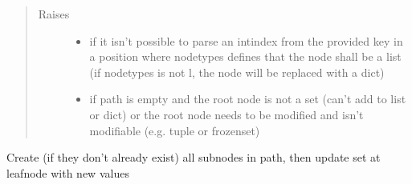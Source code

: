 \documentclass[a4paper,10pt,english]{sphinxmanual}
\begin{document}
\begin{fulllineitems}
\begin{fulllineitems}
\begin{quote}
\begin{description}
\item[{Raises}] \leavevmode\begin{itemize}
\item {}
\sphinxAtStartPar
{} \textendash{} if it isn’t possible to parse an int\sphinxhyphen{}index from the provided key in a position where node\sphinxhyphen{}types
    defines that the node shall be a list (if node\sphinxhyphen{}types is not l, the node will be replaced with a dict)

\item {}
\sphinxAtStartPar
{} \textendash{} if path is empty and the root node is not a set (can’t add to list or dict) or the root node
    needs to be modified and isn’t modifiable (e.g. tuple or frozenset)

\end{itemize}

\end{description}\end{quote}

\end{fulllineitems}


\begin{fulllineitems}
\label{\detokenize{fagus.fagus:fagus.fagus.Fagus.update}}
\pysigstartsignatures
{}
\pysigstopsignatures
\sphinxAtStartPar
Create (if they don’t already exist) all sub\sphinxhyphen{}nodes in path, then update set at leaf\sphinxhyphen{}node with new values


\end{fulllineitems}
\end{fulllineitems}
\end{document}
